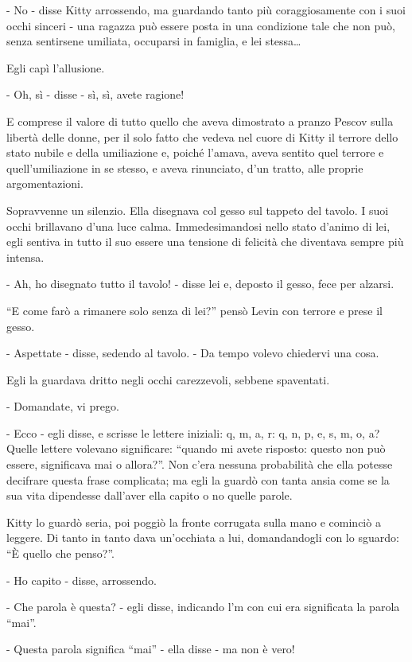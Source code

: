 - No - disse Kitty arrossendo, ma guardando tanto più coraggiosamente con i suoi occhi sinceri - una ragazza può essere posta in una condizione tale che non può, senza sentirsene umiliata, occuparsi in famiglia, e lei stessa\ldots{} 

Egli capì l'allusione. 

- Oh, sì - disse - sì, sì, avete ragione! 

E comprese il valore di tutto quello che aveva dimostrato a pranzo Pescov sulla libertà delle donne, per il solo fatto che vedeva nel cuore di Kitty il terrore dello stato nubile e della umiliazione e, poiché l'amava, aveva sentito quel terrore e quell'umiliazione in se stesso, e aveva rinunciato, d'un tratto, alle proprie argomentazioni. 

Sopravvenne un silenzio. Ella disegnava col gesso sul tappeto del tavolo. I suoi occhi brillavano d'una luce calma. Immedesimandosi nello stato d'animo di lei, egli sentiva in tutto il suo essere una tensione di felicità che diventava sempre più intensa. 

- Ah, ho disegnato tutto il tavolo! - disse lei e, deposto il gesso, fece per alzarsi. 

``E come farò a rimanere solo senza di lei?'' pensò Levin con terrore e prese il gesso. 

- Aspettate - disse, sedendo al tavolo. - Da tempo volevo chiedervi una cosa. 

Egli la guardava dritto negli occhi carezzevoli, sebbene spaventati. 

- Domandate, vi prego. 

- Ecco - egli disse, e scrisse le lettere iniziali: q, m, a, r: q, n, p, e, s, m, o, a? Quelle lettere volevano significare: ``quando mi avete risposto: questo non può essere, significava mai o allora?''. Non c'era nessuna probabilità che ella potesse decifrare questa frase complicata; ma egli la guardò con tanta ansia come se la sua vita dipendesse dall'aver ella capito o no quelle parole. 

Kitty lo guardò seria, poi poggiò la fronte corrugata sulla mano e cominciò a leggere. Di tanto in tanto dava un'occhiata a lui, domandandogli con lo sguardo: ``È quello che penso?''. 

- Ho capito - disse, arrossendo. 

- Che parola è questa? - egli disse, indicando l'm con cui era significata la parola ``mai''. 

- Questa parola significa ``mai'' - ella disse - ma non è vero! 

